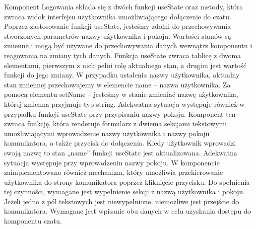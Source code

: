 Komponent Logowania składa się z dwóch funkcji useState oraz metody, która zwraca widok interfejsu użytkownika umożliwiającego dołączenie do czatu. Poprzez zastosowanie funkcji useState, jesteśmy zdolni do przechowywania stworzonych parametrów nazwy użytkownika i pokoju. Wartości stanów są zmienne i mogą być używane do przechowywania danych wewnątrz komponentu i reagowania na zmiany tych danych. Funkcja useState zwraca tablicę z dwoma elementami, pierwszym z nich pełni rolę aktualnego stan, a drugim jest wartość funkcji do jego zmiany. W przypadku ustalenia nazwy użytkownika, aktualny stan zmiennej przechowujemy w elemencie name – nazwa użytkownika. Za pomocą elementu setName – jesteśmy w stanie zmieniać  nazwę użytkownika, której zmienna przyjmuje typ string. Adekwatna sytuacja występuje również w przypadku funkcji useState przy przypisaniu nazwy pokoju. Komponent ten zwraca funkcję, która renderuje formularz z dwiema sekcjami tekstowymi umożliwiającymi wprowadzenie nazwy użytkownika i nazwy pokoju komunikatora, a także przycisk do dołączenia. Kiedy użytkownik wprowadzi swoją nazwę to stan „name” funkcji useState jest aktualizowana. Adekwatna sytuacja występuje przy wprowadzeniu nazwy pokoju. W komponencie zaimplementowano również mechanizm, który umożliwia przekierowanie użytkownika do strony komunikatora poprzez kliknięcie przycisku. Do spełnienia tej czynności, wymagane jest wypełnienie sekcji z nazwą użytkownika i pokoju. Jeżeli jedno z pól tekstowych jest niewypełnione, niemożliwe jest przejście do komunikatora. Wymagane jest wpisanie obu danych w celu uzyskania dostępu do komponentu czatu.
